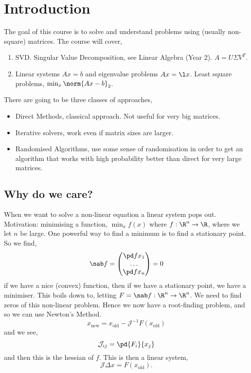 
\section{Introduction}
The goal of this course is to solve and understand problems using (usually non-square) matrices. The course will cover,
\begin{enumerate}
  \item SVD. Singular Value Decomposition, see Linear Algebra (Year 2). $A = U\Sigma V^T$.
  \item Linear systems $Ax = b$ and eigenvalue problems $Ax = \l x$. Least square problems, $\min_x \norm {Ax - b}_2$.
\end{enumerate}

There are going to be three classes of approaches,
\begin{itemize}
  \item Direct Methods, classical approach. Not useful for very big matrices.
  \item Iterative solvers, work even if matrix sizes are larger.
  \item Randomised Algorithms, use some sense of randomisation in order to get an algorithm that works with high probability better than direct for very large matrices.
\end{itemize}

\subsection{Why do we care?}
When we want to solve a non-linear equation a linear system pops out. Motivation: minimising a function, $\min_x f(x)$ where $f : \R^n \to \R$, where we let $n$ be large. One powerful way to find a minimum is to find a stationary point. So we find,
$$ \nab f = \begin{pmatrix}
  \pd f {x_1} \\ \dots \\ \pd f {x_n}
\end{pmatrix} = 0$$
if we have a nice (convex) function, then if we have a stationary point, we have a minimiser. This boils down to, letting $F = \nab f : \R^n \to \R^n$. We need to find zeros of this non-linear problem. Hence we now have a root-finding problem, and so we can use Newton's Method.
$$ x_{\text{new}} = x_{\text{old}} - \mathcal{J}^{-1}F(x_{\text{old}}) $$
and we see,
$$ \mathcal{J}_{ij} = \pd {F_i} {x_j} $$
and then this is the hessian of $f$. This is then a linear system,
$$ \mathcal{J}\Delta x = F(x_{\text{old}}). $$

